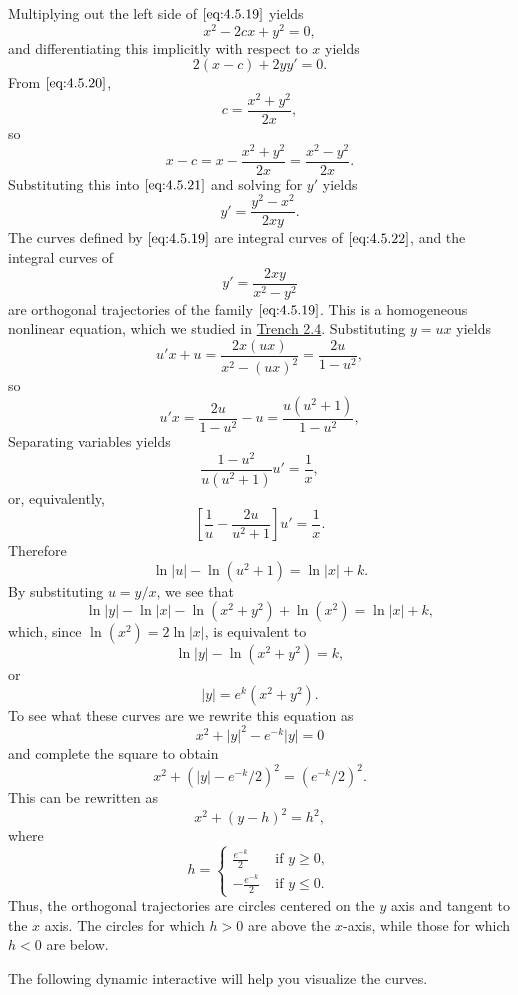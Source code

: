 \documentclass{ximera}
\begin{document}
\begin{example}
\begin{explanation}
Multiplying out the left side of $\eqref{eq:4.5.19}$ yields
\begin{equation} \label{eq:4.5.20}
x^2-2cx+y^2=0,
\end{equation}
and differentiating this implicitly with respect to $x$ yields
\begin{equation} \label{eq:4.5.21}
2(x-c)+2yy'=0.
\end{equation}
 From $\eqref{eq:4.5.20}$,
$$
c=\frac{x^2+y^2}{2x},
$$
so
$$
x-c=x-\frac{x^2+y^2}{2x}=\frac{x^2-y^2}{2x}.
$$
Substituting this into $\eqref{eq:4.5.21}$ and solving for $y'$ yields
\begin{equation} \label{eq:4.5.22}
y'=\frac{y^2-x^2}{2xy}.
\end{equation}
The curves defined by $\eqref{eq:4.5.19}$ are integral curves of
$\eqref{eq:4.5.22}$, and the integral curves of
$$
y'=\frac{2xy}{x^2-y^2}
$$
are orthogonal trajectories of the family $\eqref{eq:4.5.19}$. This is a
homogeneous nonlinear equation, which we studied in
\href{https://xerxes.ximera.org/differentialequations/main/nonlinearToSeparable/nonlinearToSeparable}{Trench 2.4}. Substituting $y=ux$ yields
$$
u'x+u=\frac{2x(ux)}{x^2-(ux)^2}=\frac{2u}{1-u^2},
$$
so
$$
u'x=\frac{2u}{1-u^2}-u=\frac{u(u^2+1)}{1-u^2},
$$
Separating variables yields
$$
\frac{1-u^2}{u(u^2+1)}u'=\frac{1}{x},
$$
or, equivalently,
$$
\left[\frac{1}{u}-\frac{2u}{u^2+1}\right]u'=\frac{1}{x}.
$$
Therefore
$$
\ln |u|-\ln (u^2+1)=\ln |x|+k.
$$
By substituting $u=y/x$, we see that
$$
\ln|y|-\ln|x|-\ln(x^2+y^2)+\ln(x^2)=\ln|x|+k,
$$
which, since $\ln(x^2)=2\ln|x|$, is equivalent to
$$
\ln|y|-\ln(x^2+y^2)=k,
$$
or
$$
|y|=e^k(x^2+y^2).
$$
To see what these curves are we rewrite this equation as
$$
x^2+|y|^2-e^{-k}|y|=0
$$
and complete the square to obtain
$$
x^2+(|y|-e^{-k}/2)^2=(e^{-k}/2)^2.
$$
This can be rewritten as
$$
x^2+(y-h)^2=h^2,
$$
where
$$
h=\left\{\begin{array}{rl} \frac{e^{-k}}{2}&\mbox{ if } y\geq
0,\\-\frac{e^{-k}}{2}&\mbox{ if } y\leq 0. \end{array}\right.
$$
Thus, the orthogonal trajectories are circles centered on the $y$ axis
and tangent to the $x$ axis. The circles
for which $h>0$ are above the $x$-axis, while those for which $h<0$
are below.


 

The following dynamic interactive will help you visualize the curves.

\begin{center}  
\end{center}

 
\end{explanation}
\end{example}
 
\end{document}
